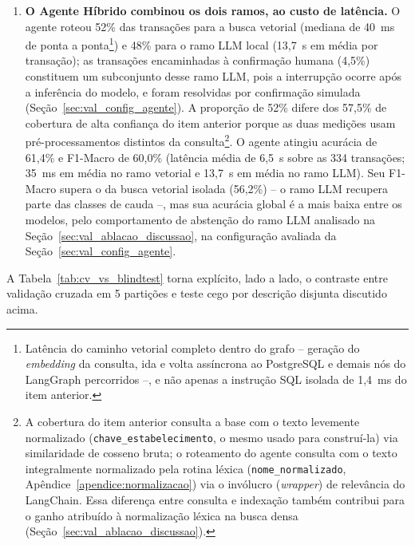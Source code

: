 \begin{enumerate}
	\item \textbf{O Agente Híbrido combinou os dois ramos, ao custo de latência.} O agente roteou 52\% das transações para a busca vetorial (mediana de 40~ms de ponta a ponta\footnote{Latência do caminho vetorial completo dentro do grafo -- geração do \textit{embedding} da consulta, ida e volta assíncrona ao PostgreSQL e demais nós do LangGraph percorridos --, e não apenas a instrução SQL isolada de 1,4~ms do item anterior.}) e 48\% para o ramo LLM local (13,7~s em média por transação); as transações encaminhadas à confirmação humana (4,5\%) constituem um subconjunto desse ramo LLM, pois a interrupção ocorre após a inferência do modelo, e foram resolvidas por confirmação simulada (Seção~\ref{sec:val_config_agente}). A proporção de 52\% difere dos 57,5\% de cobertura de alta confiança do item anterior porque as duas medições usam pré-processamentos distintos da consulta\footnote{A cobertura do item anterior consulta a base com o texto levemente normalizado (\texttt{chave\_estabelecimento}, o mesmo usado para construí-la) via similaridade de cosseno bruta; o roteamento do agente consulta com o texto integralmente normalizado pela rotina léxica (\texttt{nome\_normalizado}, Apêndice~\ref{apendice:normalizacao}) via o invólucro (\textit{wrapper}) de relevância do LangChain. Essa diferença entre consulta e indexação também contribui para o ganho atribuído à normalização léxica na busca densa (Seção~\ref{sec:val_ablacao_discussao}).}. O agente atingiu acurácia de 61,4\% e F1-Macro de 60,0\% (latência média de 6,5~s sobre as 334 transações; 35~ms em média no ramo vetorial e 13,7~s em média no ramo LLM). Seu F1-Macro supera o da busca vetorial isolada (56,2\%) -- o ramo LLM recupera parte das classes de cauda --, mas sua acurácia global é a mais baixa entre os modelos, pelo comportamento de abstenção do ramo LLM analisado na Seção~\ref{sec:val_ablacao_discussao}, na configuração avaliada da Seção~\ref{sec:val_config_agente}.
\end{enumerate}

A Tabela~\ref{tab:cv_vs_blindtest} torna explícito, lado a lado, o contraste entre validação cruzada em 5 partições e teste cego por descrição disjunta discutido acima.

